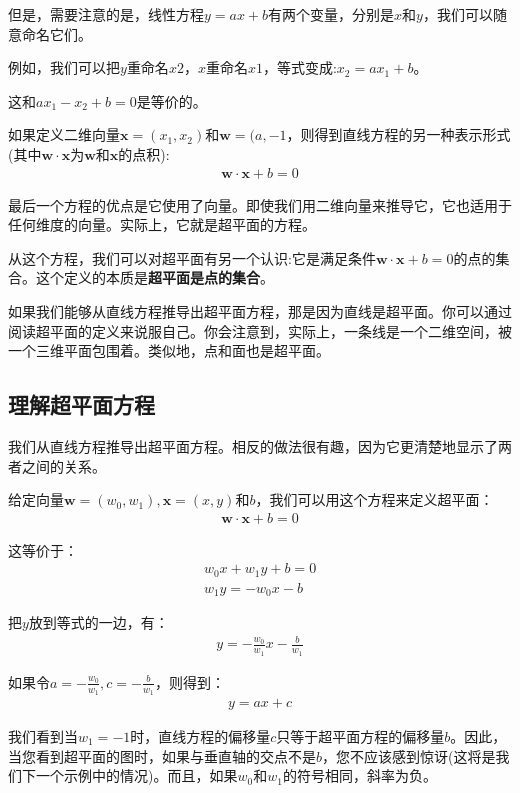 但是，需要注意的是，线性方程$y=ax+b$有两个变量，分别是$x$和$y$，我们可以随意命名它们。

例如，我们可以把$y$重命名$x2$，$x$重命名$x1$，等式变成:$x_2=ax_1+b$。

这和$ax_1-x_2+b=0$是等价的。

如果定义二维向量$\mathbf{x}=(x_1,x_2)$和$\mathbf{w}=(a,-1$，则得到直线方程的另一种表示形式(其中$\mathbf{w}\cdot\mathbf{x}$为$\mathbf{w}$和$\mathbf{x}$的点积):
\begin{gather*}
\mathbf{w}\cdot\mathbf{x} + b =0
\end{gather*}

最后一个方程的优点是它使用了向量。即使我们用二维向量来推导它，它也适用于任何维度的向量。实际上，它就是超平面的方程。

从这个方程，我们可以对超平面有另一个认识:它是满足条件$\mathbf{w}\cdot\mathbf{x} + b =0$的点的集合。这个定义的本质是\textbf{超平面是点的集合}。

如果我们能够从直线方程推导出超平面方程，那是因为直线是超平面。你可以通过阅读超平面的定义来说服自己。你会注意到，实际上，一条线是一个二维空间，被一个三维平面包围着。类似地，点和面也是超平面。

\subsection{理解超平面方程}
我们从直线方程推导出超平面方程。相反的做法很有趣，因为它更清楚地显示了两者之间的关系。

给定向量$\mathbf{w}=(w_0,w_1),\mathbf{x}=(x,y)$和$b$，我们可以用这个方程来定义超平面：
\begin{gather*}
\mathbf{w}\cdot\mathbf{x} + b =0
\end{gather*}

这等价于：
\begin{gather*}
w_0 x +w_1 y+b =0 \\
w_1 y=-w_0 x-b
\end{gather*}

把$y$放到等式的一边，有：
\begin{gather*}
y = -\frac{w_0}{w_1}x-\frac{b}{w_1}
\end{gather*}

如果令$a=-\frac{w_0}{w_1},c=-\frac{b}{w_1}$，则得到：
\begin{gather*}
y=ax+c
\end{gather*}

我们看到当$w_1=-1$时，直线方程的偏移量$c$只等于超平面方程的偏移量$b$。因此，当您看到超平面的图时，如果与垂直轴的交点不是$b$，您不应该感到惊讶(这将是我们下一个示例中的情况)。而且，如果$w_0$和$w_1$的符号相同，斜率为负。

